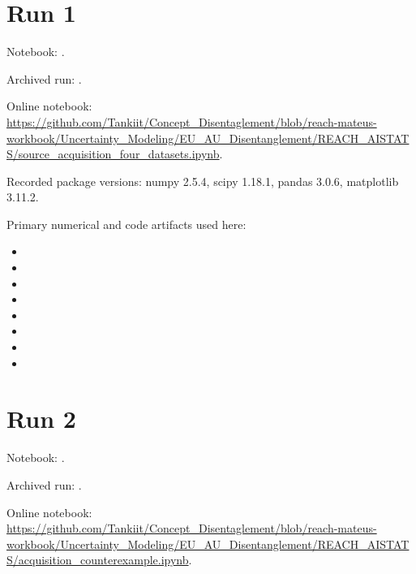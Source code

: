 \section{Run 1}

Notebook: .

Archived run: .

Online notebook: \url{https://github.com/Tankiit/Concept_Disentaglement/blob/reach-mateus-workbook/Uncertainty_Modeling/EU_AU_Disentanglement/REACH_AISTATS/source_acquisition_four_datasets.ipynb}.

Recorded package versions: numpy 2.5.4, scipy 1.18.1, pandas 3.0.6, matplotlib 3.11.2.

Primary numerical and code artifacts used here:

\begin{itemize}

\item {}

\item {}

\item {}

\item {}

\item {}

\item {}

\item {}

\item {}

\end{itemize}

\section{Run 2}

Notebook: .

Archived run: .

Online notebook: \url{https://github.com/Tankiit/Concept_Disentaglement/blob/reach-mateus-workbook/Uncertainty_Modeling/EU_AU_Disentanglement/REACH_AISTATS/acquisition_counterexample.ipynb}.

